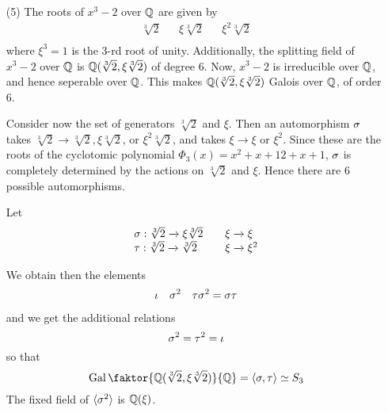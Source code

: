 \begin{example}
\begin{enumerate}
        \item[(5)] The roots of $x^3-2$ over  $\mathbb{Q}$ are given by
            \begin{align*}
                \sqrt[3]{2} && \xi\sqrt[3]{2}   &&  \xi^2\sqrt[3]{2}    \\
            \end{align*}
            where $\xi^3=1$ is the  $3$-rd root of unity. Additionally, the
            splitting field of  $x^3-2$ over  $\mathbb{Q}$ is  $\mathbb{Q}(\sqrt[3]{2},
            \xi\sqrt[3]{2})$ of degree $6$. Now,  $x^3-2$ is irreducible over
            $\mathbb{Q}$, and hence seperable over  $\mathbb{Q}$. This makes  $\mathbb{Q}(\sqrt[3]{2},
            \xi\sqrt[3]{2})$ Galois over $\mathbb{Q}$, of order  $6$.

            Consider now the set of generators $\sqrt[3]{2}$ and $\xi$. Then an
            automorphism  $\sigma$ takes  $\sqrt[3]{2} \xrightarrow{} \sqrt[3]{2},
            \xi\sqrt[3]{2}$, or $\xi^2\sqrt[3]{2}$, and takes  $\xi
            \xrightarrow{} \xi$ or $\xi^2$. Since these are the roots of the
            cyclotomic polynomial $\Phi_3(x)=x^2+x+12+x+1$, $\sigma$ is completely
            determined by the actions on  $\sqrt[3]{2}$ and  $\xi$. Hence there
            are  $6$ possible automorphisms.

            Let
            \begin{equation*}
                \begin{array}{lcl}
                    \sigma: \sqrt[3]{2} \xrightarrow{} \xi\sqrt[3]{2}    &&  \xi
                                                    \xrightarrow{} \xi  \\

                    \tau: \sqrt[3]{2} \xrightarrow{} \sqrt[3]{2}    &&  \xi
                                                    \xrightarrow{} \xi^2  \\
                \end{array}
            \end{equation*}

            We obtain then the elements
            \begin{align*}
                \iota  &&  \sigma^2    &&  \tau\sigma^2=\sigma\tau \\
            \end{align*}
            and we get the additional relations
            \begin{equation*}
                \sigma^2=\tau^2=\iota
            \end{equation*}
            so that
            \begin{equation*}
                \Gal{\faktor{\Q(\sqrt[3]{2}, \xi\sqrt[3]{2})}{\Q}}=
                \langle \s,\t \rangle \simeq S_3
            \end{equation*}
            The fixed field of $\langle \sigma^2 \rangle$ is $\mathbb{Q}(\xi)$.


\end{enumerate}
\end{example}
